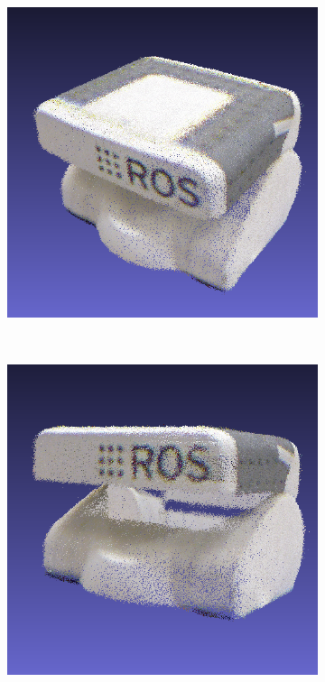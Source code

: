 \documentclass[letterpaper, 10 pt, conference]{ieeeconf}  %
\begin{document}
\begin{figure}[t]
	\centering
        \begin{subfigure}[b]{0.45\linewidth}
                \centering
                \includegraphics[width=\linewidth]{../models/pr2_full.png}
                \caption{}
        \end{subfigure}%
        ~ %
        \begin{subfigure}[b]{0.45\linewidth}
                \centering
                \includegraphics[width=\linewidth]{../models/pr2_holes.png}

\end{subfigure}
\end{figure}
\end{document}
